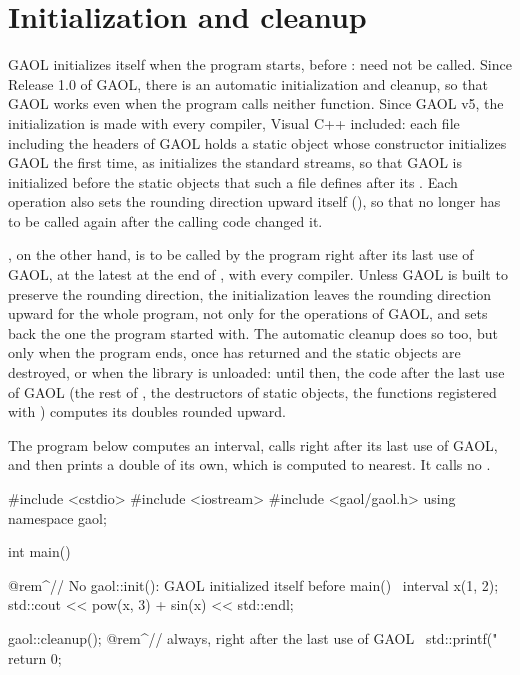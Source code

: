 \documentclass[12pt,a4paper,twoside,openright]{book}
\begin{document}
\section{Initialization and cleanup}\label{chap:init}
%

GAOL initializes itself when the program starts, before :
 need not be called. Since Release 1.0 of GAOL, there is an
automatic initialization and cleanup, so that GAOL works even when the program
calls neither function. Since GAOL v5, the initialization is made with every
compiler, Visual C++ included: each file including the headers of GAOL holds
a static object whose constructor initializes GAOL the first time, as
 initializes the standard streams, so that GAOL is
initialized before the static objects that such a file defines after its
. Each operation also sets the rounding direction upward
itself (), so that  no longer has
to be called again after the calling code changed it.\newinvfive

\begin{Rem}\label{rem:cleanup-rounding}
, on the other hand, is to be called by the program right
after its last use of GAOL, at the latest at the end of , with
every compiler.\newinvfive{} Unless GAOL is built to preserve the rounding
direction, the initialization leaves the rounding direction upward for the
whole program, not only for the operations of GAOL, and  sets
back the one the program started with. The automatic cleanup does so too, but
only when the program ends, once  has returned and the static
objects are destroyed, or when the library is unloaded: until then, the code
after the last use of GAOL (the rest of , the destructors of
static objects, the functions registered with ) computes
its doubles rounded upward.
\end{Rem}

\begin{Ex}\label{ex:cleanup}
The program below computes an interval, calls  right after
its last use of GAOL, and then prints a double of its own, which is computed
to nearest. It calls no .
\begin{example}
#include <cstdio>
#include <iostream>
#include <gaol/gaol.h>
using namespace gaol;

int main()
{
  @rem^// No gaol::init(): GAOL initialized itself before main()~
  interval x(1, 2);
  std::cout << pow(x, 3) + sin(x) << std::endl;

  gaol::cleanup();   @rem^// always, right after the last use of GAOL~
  std::printf("%
  return 0;
}
\end{example}
\end{Ex}
\end{document}
